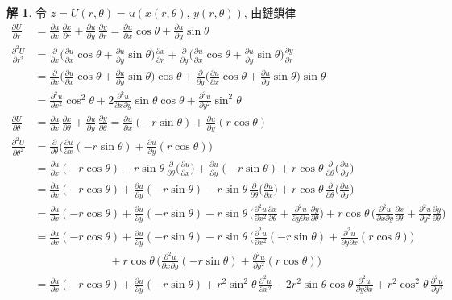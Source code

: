 \documentclass[12pt]{extarticle}
\newcommand{\ds}{\displaystyle}
\theoremstyle{definition}
\newtheorem*{sol}{解}
\newcommand{\pdiff}[2]{\frac{\partial #1}{\partial #2}}
\newcommand{\pdifft}[2]{\frac{\partial^2 #1}{\partial #2^2}}
\begin{document}
\begin{sol}
  令 $\ds z = U(r, \theta) = u(x(r, \theta),\,y(r,\theta))$, 由鏈鎖律 
  \begin{align*}
    \pdiff{U}{r} &= \pdiff{u}{x}\,\pdiff{x}{r} + \pdiff{u}{y}\,\pdiff{y}{r} = \pdiff{u}{x}\cos\theta + \pdiff{u}{y}\sin\theta \\
    \pdifft{U}{r} &= \pdiff{}{x}\bigg(\pdiff{u}{x}\cos\theta + \pdiff{u}{y}\sin\theta\bigg)\pdiff{x}{r} + \pdiff{}{y}\bigg(\pdiff{u}{x}\cos\theta + \pdiff{u}{y}\sin\theta\bigg)\pdiff{y}{r} \\
    &= \pdiff{}{x}\bigg(\pdiff{u}{x}\cos\theta + \pdiff{u}{y}\sin\theta\bigg)\cos\theta + \pdiff{}{y}\bigg(\pdiff{u}{x}\cos\theta + \pdiff{u}{y}\sin\theta\bigg)\sin\theta \\
    &= \pdifft{u}{x}\cos^2\theta + 2\frac{\partial^2 u}{\partial x\partial y}\sin\theta\cos\theta + \pdifft{u}{y}\sin^2\theta \\
    \pdiff{U}{\theta} &= \pdiff{u}{x}\,\pdiff{x}{\theta} + \pdiff{u}{y}\,\pdiff{y}{\theta} = \pdiff{u}{x}(-r\sin\theta) + \pdiff{u}{y}(r\cos\theta) \\
    \pdifft{U}{\theta} &= \pdiff{}{\theta}\bigg(\pdiff{u}{x}(-r\sin\theta) + \pdiff{u}{y}(r\cos\theta)\bigg) \\
    &= \pdiff{u}{x}(-r\cos\theta) - r\sin\theta\,\pdiff{}{\theta}\bigg(\pdiff{u}{x}\bigg) + \pdiff{u}{y}(-r\sin\theta) + r\cos\theta\,\pdiff{}{\theta}\bigg(\pdiff{u}{y}\bigg) \\
    &= \pdiff{u}{x}(-r\cos\theta) + \pdiff{u}{y}(-r\sin\theta) - r\sin\theta\,\pdiff{}{\theta}\bigg(\pdiff{u}{x}\bigg) + r\cos\theta\,\pdiff{}{\theta}\bigg(\pdiff{u}{y}\bigg) \\
    &= \pdiff{u}{x}(-r\cos\theta) + \pdiff{u}{y}(-r\sin\theta) - r\sin\theta\,\bigg(\pdifft{u}{x}\pdiff{x}{\theta} + \frac{\partial^2 u}{\partial y\partial x}\pdiff{y}{\theta}\bigg) + r\cos\theta\,\bigg(\frac{\partial^2 u}{\partial x\partial y}\pdiff{x}{\theta} + \pdifft{u}{y}\pdiff{y}{\theta}\bigg) \\
    &= \pdiff{u}{x}(-r\cos\theta) + \pdiff{u}{y}(-r\sin\theta) - r\sin\theta\,\bigg(\pdifft{u}{x}(-r\sin\theta) + \frac{\partial^2 u}{\partial y\partial x}(r\cos\theta)\bigg) \\
    &\qquad\qquad\qquad\;\,\,+ r\cos\theta\,\bigg(\frac{\partial^2 u}{\partial x\partial y}(-r\sin\theta) + \pdifft{u}{y}(r\cos\theta)\bigg) \\
    &= \pdiff{u}{x}(-r\cos\theta) + \pdiff{u}{y}(-r\sin\theta) + r^2\sin^2\theta\,\pdifft{u}{x} -2r^2\sin\theta\cos\theta\,\frac{\partial^2 u}{\partial y\partial x} + r^2\cos^2\theta\,\pdifft{u}{y}

\end{align*}
\end{sol}
\end{document}
